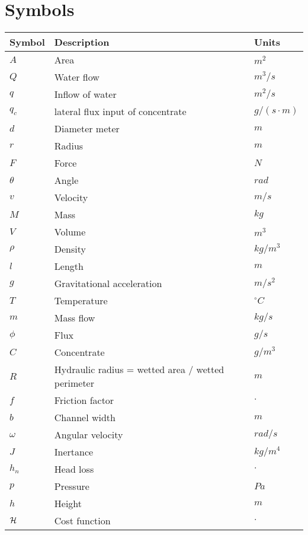 \section*{Symbols}
\begin{longtable}[H]{p{80pt} p{280pt} p{50pt}} 
\textbf{Symbol}	& \textbf{Description} & \textbf{Units}  \\ \hline
$A$ 	& Area 				& $m^2$ \\ 
$Q$	 	& Water flow 		& $m^3/s$ \\
$q$	 	& Inflow of water 	& $m^2/s$ \\
$q_c$ 	& lateral flux input of concentrate & $g/(s\cdot m)$ \\
$d$ 	& Diameter meter 	& $m$ \\ 
$r$ 	& Radius 			& $m$ \\ 
$F$ 	& Force 			& $N$ \\ 
$\theta$ & Angle 			& $rad$ \\ 
$v$ 	& Velocity 			& $m/s$ \\ 
$M$ 	& Mass 				& $kg$ \\
$V$ 	& Volume 			& $m^3$ \\
$\rho$ 	& Density 			& $kg/m^3$ \\
$l$ 	& Length		 	& $m$ \\
$g$ 	& Gravitational acceleration & $m/s^2$ \\
$T$ 	& Temperature 		& $^{\circ}C$ \\
$m$ 	& Mass flow 		& $kg/s$ \\
$\phi$ 	& Flux 				& $g/s$ \\
$C$ 	& Concentrate 		& $g/m^3$ \\
$R$ 	& Hydraulic radius = wetted area / wetted perimeter & $m$ \\
$f$ 	& Friction factor 	& $\cdot$ \\
$b$ 	& Channel width 	& $m$ \\
$\omega$& Angular velocity	& $rad/s$ \\
$J$		& Inertance			& $kg/m^4$ \\
$h_n$	& Head loss			& $\cdot$ \\
$p$		& Pressure			& $Pa$ \\
$h$		& Height			& $m$ \\
$\CMcal{H}$& Cost function  & $\cdot$ \\

\end{longtable}


